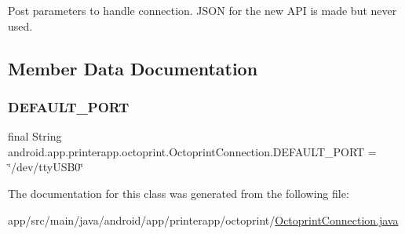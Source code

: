 Post parameters to handle connection. J\+S\+ON for the new A\+PI is made but never used. 

\subsection{Member Data Documentation}
\mbox{\label{classandroid_1_1app_1_1printerapp_1_1octoprint_1_1_octoprint_connection_aa75c1a4b840d111cfe50a36d28763b0e}} 
\subsubsection{\texorpdfstring{D\+E\+F\+A\+U\+L\+T\+\_\+\+P\+O\+RT}{DEFAULT\_PORT}}
{\footnotesize\ttfamily final String android.\+app.\+printerapp.\+octoprint.\+Octoprint\+Connection.\+D\+E\+F\+A\+U\+L\+T\+\_\+\+P\+O\+RT = \char`\"{}/dev/tty\+U\+S\+B0\char`\"{}\hspace{0.3cm}{\ttfamily [static]}}



The documentation for this class was generated from the following file\+:\begin{DoxyCompactItemize}
\item 
app/src/main/java/android/app/printerapp/octoprint/\hyperlink{_octoprint_connection_8java}{Octoprint\+Connection.\+java}\end{DoxyCompactItemize}
